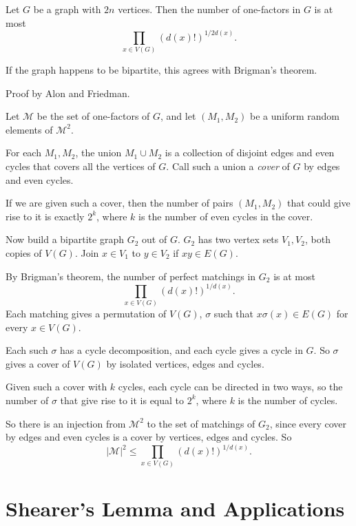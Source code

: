 \documentclass[12pt]{article}
\begin{document}
\begin{theorem}
	Let $G$ be a graph with $2n$ vertices. Then the number of one-factors in $G$ is at most
	\[
	\prod_{x \in V(G)}(d(x)!)^{1/2d(x)}.
	\]
\end{theorem}

If the graph happens to be bipartite, this agrees with Brigman's theorem.

\begin{proofbox}
	Proof by Alon and Friedman.

	Let $\mathcal{M}$ be the set of one-factors of $G$, and let $(M_1, M_2)$ be a uniform random elements of $\mathcal{M}^2$.

	For each $M_1, M_2$, the union $M_1 \cup M_2$ is a collection of disjoint edges and even cycles that covers all the vertices of $G$. Call such a union a \emph{cover} of $G$ by edges and even cycles.

	If we are given such a cover, then the number of pairs $(M_1, M_2)$ that could give rise to it is exactly $2^{k}$, where $k$ is the number of even cycles in the cover.

	Now build a bipartite graph $G_2$ out of $G$. $G_2$ has two vertex sets $V_1, V_2$, both copies of $V(G)$. Join $x \in V_1$ to $y \in V_2$ if $xy \in E(G)$.

	By Brigman's theorem, the number of perfect matchings in $G_2$ is at most
	\[
	\prod_{x \in V(G)}(d(x)!)^{1/d(x)}.
	\]
	Each matching gives a permutation of $V(G)$, $\sigma$ such that $x \sigma(x) \in E(G)$ for every $x \in V(G)$.

	Each such $\sigma$ has a cycle decomposition, and each cycle gives a cycle in $G$. So $\sigma$ gives a cover of $V(G)$ by isolated vertices, edges and cycles.

	Given such a cover with $k$ cycles, each cycle can be directed in two ways, so the number of $\sigma$ that give rise to it is equal to $2^{k}$, where $k$ is the number of cycles.

	So there is an injection from $\mathcal{M}^2$ to the set of matchings of $G_2$, since every cover by edges and even cycles is a cover by vertices, edges and cycles. So
	\[
	|\mathcal{M}|^2 \leq \prod_{x \in V(G)}(d(x)!)^{1/d(x)}.
	\]
\end{proofbox}

\newpage

\section{Shearer's Lemma and Applications}%
\label{sec:sl}
\end{document}
